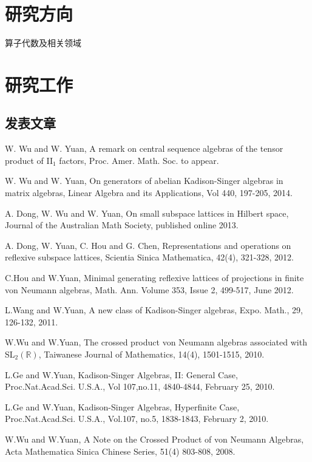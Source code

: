 \documentclass[letterpaper]{article}
\newcommand{\R}{\mathbb R}
\begin{document}
\section*{研究方向}
算子代数及相关领域

\section*{研究工作}

\subsection*{发表文章}

\begin{etaremune}
 \item W. Wu and W. Yuan, A remark on central sequence algebras of the tensor product of II$_1$ factors, Proc. Amer. Math. Soc. to appear.

 
 \item W. Wu and W. Yuan, On generators of abelian Kadison-Singer algebras in matrix algebras, Linear Algebra and its Applications, Vol 440, 197-205, 2014.

 \item A. Dong, W. Wu and W. Yuan, On small subspace lattices in Hilbert space, Journal of the Australian Math Society, published online 2013.

  \item A. Dong, W. Yuan, C. Hou and G. Chen, Representations and operations on reflexive subspace lattices, Scientia Sinica Mathematica,
         42(4), 321-328, 2012.
   \item C.Hou and W.Yuan, Minimal generating reflexive lattices of projections in finite von Neumann algebras, Math. Ann.
         Volume 353, Issue 2, 499-517, June 2012.
   \item L.Wang and W.Yuan, A new class of Kadison-Singer algebras, Expo. Math., 29, 126-132, 2011.
   \item W.Wu and W.Yuan, The crossed product von Neumann algebras associated with SL$_2(\R)$, Taiwanese Journal of Mathematics, 14(4), 1501-1515, 2010.
   \item L.Ge and  W.Yuan, Kadison-Singer Algebras, II: General Case, Proc.Nat.Acad.Sci. U.S.A., Vol 107,no.11, 4840-4844, February 25, 2010.
   \item L.Ge and  W.Yuan, Kadison-Singer Algebras, Hyperfinite Case, Proc.Nat.Acad.Sci. U.S.A., Vol.107, no.5, 1838-1843, February 2, 2010.
   \item W.Wu and W.Yuan, A Note on the Crossed Product of von Neumann Algebras, Acta Mathematica Sinica Chinese Series, 51(4) 803-808, 2008.
\end{etaremune}
\end{document}
